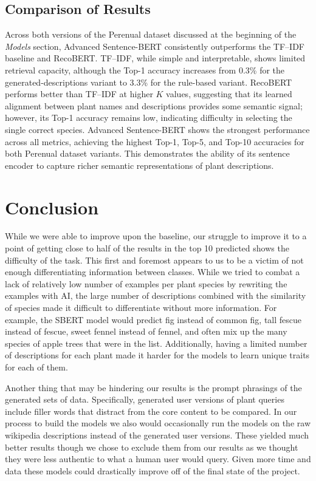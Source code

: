 \documentclass[11pt]{article}
\begin{document}
\subsection{Comparison of Results}

Across both versions of the Perenual dataset discussed at the beginning of the
\textit{Models} section, Advanced Sentence-BERT consistently outperforms the
TF--IDF baseline and RecoBERT. TF--IDF, while simple and interpretable, shows
limited retrieval capacity, although the Top-1 accuracy increases from 0.3\% for
the generated-descriptions variant to 3.3\% for the rule-based variant.
RecoBERT performs better than TF--IDF at higher $K$ values, suggesting that its
learned alignment between plant names and descriptions provides some semantic
signal; however, its Top-1 accuracy remains low, indicating difficulty in
selecting the single correct species. Advanced Sentence-BERT shows the strongest
performance across all metrics, achieving the highest Top-1, Top-5, and Top-10
accuracies for both Perenual dataset variants. This demonstrates the ability of
its sentence encoder to capture richer semantic representations of plant
descriptions.

\section*{Conclusion}
While we were able to improve upon the baseline, our struggle to improve it to a point of getting close to half of the results in the top 10 predicted shows the difficulty of the task. This first and foremost appears to us to be a victim of not enough differentiating information between classes. While we tried to combat a lack of relatively low number of examples per plant species by rewriting the examples with AI, the large number of descriptions combined with the similarity of species made it difficult to differentiate without more information. For example, the SBERT model would predict fig instead of common fig, tall fescue instead of fescue, sweet fennel instead of fennel, and often mix up the many species of apple trees that were in the list. Additionally, having a limited number of descriptions for each plant made it harder for the models to learn unique traits for each of them.

Another thing that may be hindering our results is the prompt phrasings of the generated sets of data. Specifically, generated user versions of plant queries include filler words that distract from the core content to be compared. In our process to build the models we also would occasionally run the models on the raw wikipedia descriptions instead of the generated user versions. These yielded much better results though we chose to exclude them from our results as we thought they were less authentic to what a human user would query. Given more time and data these models could drastically improve off of the final state of the project.
\end{document}
